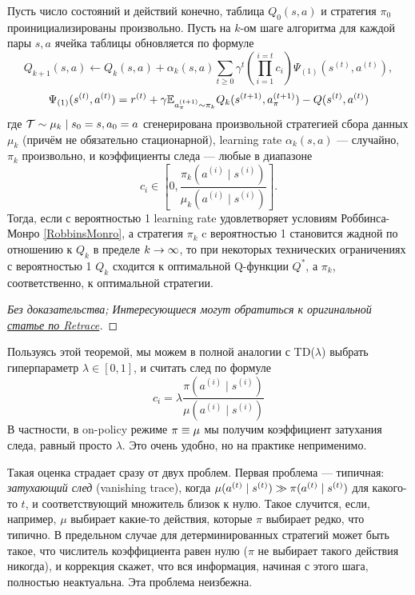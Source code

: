 \begin{theorem}[Retrace]
Пусть число состояний и действий конечно, таблица $Q_0(s, a)$ и стратегия $\pi_0$ проинициализированы произвольно. Пусть на $k$-ом шаге алгоритма для каждой пары $s, a$ ячейка таблицы обновляется по формуле
$$Q_{k+1}(s, a) \leftarrow Q_k(s, a) + \alpha_k(s, a)
\sum_{t \ge 0} \gamma^t \left( \prod_{i = 1}^{i = t}  c_{i} \right) \Psi_{(1)}(s^{(t)}, a^{(t)}),$$
$$\Psi_{(1)}(s^{(t)}, a^{(t)}) = r^{(t)} + \gamma \mathbb{E}_{a^{(t+1)}_\pi \sim \pi_k} Q_k(s^{(t+1)}, a^{(t+1)}_\pi) - Q(s^{(t)}, a^{(t)})$$
где $\Traj \HM\sim \mu_k \HM\mid s_0 \HM= s, a_0 \HM= a$ сгенерирована произвольной стратегией сбора данных $\mu_k$ (причём не обязательно стационарной), learning rate $\alpha_k(s, a)$ --- случайно, $\pi_k$ произвольно, и коэффициенты следа --- любые в диапазоне
$$c_i \in \left[ 0, \frac{\pi_k(a^{(i)} \mid s^{(i)}) }{\mu_k(a^{(i)} \mid s^{(i)})} \right].$$
Тогда, если с вероятностью 1 learning rate удовлетворяет условиям Роббинса-Монро \eqref{RobbinsMonro}, а стратегия $\pi_k$ c вероятностью 1 становится жадной по отношению к $Q_k$ в пределе $k \HM\to \infty$, то при некоторых технических ограничениях с вероятностью 1 $Q_k$ сходится к оптимальной Q-функции $Q^*$, а $\pi_k$, соответственно, к оптимальной стратегии.
\begin{proof}[Без доказательства; Интересующиеся могут обратиться к оригинальной \href{https://arxiv.org/abs/1606.02647}{статье по Retrace}]
\end{proof}
\end{theorem}

Пользуясь этой теоремой, мы можем в полной аналогии с TD($\lambda$) выбрать гиперпараметр $\lambda \in [0, 1]$, и считать след по формуле
$$
    c_i = \lambda \frac{\pi(a^{(i)} \mid s^{(i)}) }{\mu(a^{(i)} \mid s^{(i)})}
$$
В частности, в on-policy режиме $\pi \HM \equiv \mu$ мы получим коэффициент затухания следа, равный просто $\lambda$. Это очень удобно, но на практике неприменимо.

Такая оценка страдает сразу от двух проблем. Первая проблема --- типичная: \emph{затухающий след} (vanishing trace), когда $\mu(a^{(t)} \mid s^{(t)}) \HM\gg \pi(a^{(t)} \mid s^{(t)})$ для какого-то $t$, и соответствующий множитель близок к нулю. Такое случится, если, например, $\mu$ выбирает какие-то действия, которые $\pi$ выбирает редко, что типично. В предельном случае для детерминированных стратегий может быть такое, что числитель коэффициента равен нулю ($\pi$ не выбирает такого действия никогда), и коррекция скажет, что вся информация, начиная с этого шага, полностью неактуальна. Эта проблема неизбежна.

